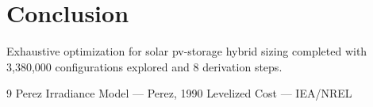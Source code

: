 \documentclass[11pt,twocolumn]{article}
\begin{document}
\section{Conclusion}
Exhaustive optimization for solar pv-storage hybrid sizing completed with 3,380,000 configurations explored and 8 derivation steps.

\begin{thebibliography}{9}
 Perez Irradiance Model --- Perez, 1990
 Levelized Cost --- IEA/NREL
\end{thebibliography}
\end{document}
